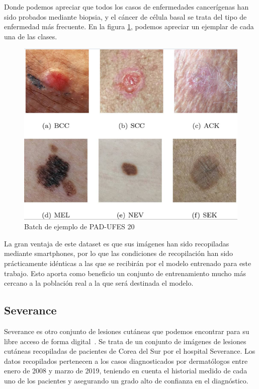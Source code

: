 Donde podemos apreciar que todos los casos de enfermedades cancerígenas han sido probados mediante biopsia, y el cáncer de célula basal se trata del tipo de enfermedad más frecuente. En la figura \ref{fig:muestrapad}, podemos apreciar un ejemplar de cada una de las clases.
\begin{figure}[H]
	\centering
	\includegraphics[scale = 0.5]{imagenes/PAD-UFES.png}
	\caption{Batch de ejemplo de PAD-UFES 20~\cite{PACHECO2020106221}}
	\label{fig:muestrapad}
\end{figure}

La gran ventaja de este dataset es que sus imágenes han sido recopiladas mediante smartphones, por lo que las condiciones de recopilación han sido prácticamente idénticas a las que se recibirán por el modelo entrenado para este trabajo. Esto aporta como beneficio un conjunto de entrenamiento mucho más cercano a la población real a la que será destinada el modelo.

\subsection{Severance}

Severance es otro conjunto de lesiones cutáneas que podemos encontrar para su libre acceso de forma digital~\cite{severance}. Se trata de un conjunto de imágenes de lesiones cutáneas recopiladas de pacientes de Corea del Sur por el hospital Severance.  Los datos recopilados pertenecen a los casos diagnosticados por dermatólogos entre enero de 2008 y marzo de 2019, teniendo en cuenta el historial medido de cada uno de los pacientes y asegurando un grado alto de confianza en el diagnóstico.


